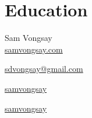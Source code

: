 \documentclass{resume}
\newcommand{\name}[1]{%
	{\Huge{#1}}
}
\begin{document}

\section{Education}

\name{Sam Vongsay}\\
\href{https://www.samvongsay.com}{samvongsay.com}

\begin{SCfigure}[][h]
	\href{mailto:sdvongsay@gmailcom}{sdvongsay@gmail.com}
\end{SCfigure}
\begin{SCfigure}[][h]
	\href{https://www.github.com/samvongsay}{samvongsay}
\end{SCfigure}
\begin{SCfigure}[][h]
	\href{https://www.linkedin.com/in/samvongsay}{samvongsay}
\end{SCfigure}
\end{document}
